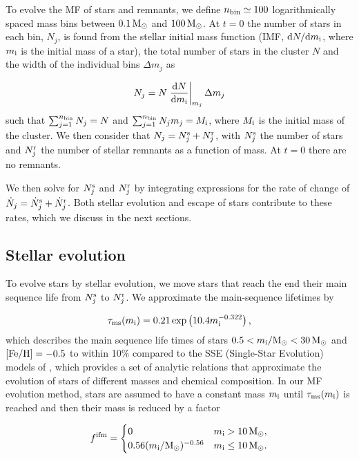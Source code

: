 \documentclass[useAMS,usenatbib,fleqn]{mnras}
\newcommand{\feh}{\[Fe/H\]}
\newcommand{\msun}{{\rm M}_\odot}
\newcommand{\comm}[1]{#1}
\def\fifm{f^{\rm ifm}}
\def\feh{{\rm [Fe/H]}}
\newcommand{\mi}{m_{\rm i}}
\newcommand{\mj}{m_j}
\newcommand{\dr}{{\rm d}}
\newcommand{\nbin}{n_{\rm bin}}
\newcommand{\nj}{N_j}
\newcommand{\njs}{N_j^{\rm s}}
\newcommand{\njr}{N_j^{\rm r}}
\newcommand{\njdot}{\dot{N}_j}
\newcommand{\njrdot}{\dot{N}_j^{\rm r}}
\newcommand{\njsdot}{\dot{N}_j^{\rm s}}
\newcommand{\tms}{\tau_{\rm ms}}
\begin{document}
To evolve the MF of  stars and remnants, we define $\nbin\simeq100$
logarithmically spaced mass bins between $0.1\,\msun$ and $100\,\msun$. At $t=0$
the number of stars in each bin, $\nj$, is found from the stellar initial mass
function (IMF, $\dr N/\dr\mi$, \comm{where $\mi$ is the initial mass of a star}),
the total number of stars in the cluster $N$ and the width of the individual
bins $\Delta \mj$ as

\begin{equation}
\nj= N \left.\frac{\dr N}{\dr\mi}\right|_{m_j} \Delta \mj
\end{equation}
such that $\sum_{j=1}^{\nbin} \nj = N$ and $\sum_{j=1}^{\nbin} \nj\mj = M_{\rm
i}$, where $M_{\rm i}$ is the initial mass of the cluster. We then consider that
$\nj = \njs  + \njr$, with $\njs$ the number of stars and $\njr$ the number of
stellar remnants as a function of mass. At $t=0$ there are no remnants. 

We then solve for $\njs$ and $\njr$ by integrating expressions for the rate
of change of $\njdot = \njsdot + \njrdot$. Both stellar evolution and escape of
stars contribute to these rates, which we discuss in the next sections. 


\subsection{Stellar evolution}
\label{ssec:sev}
To  evolve stars by stellar evolution, we move stars that reach the end their
main sequence life from $\njs$ to $\njr$.  We approximate  the main-sequence
lifetimes by

\begin{equation}
\tms(\mi) = 0.21\exp\left(10.4\mi^{-0.322}\right),
\label{eq:tms}
\end{equation}
which describes the main sequence life times of stars $0.5<\mi/\msun<30\,\msun$
and $\feh=-0.5$ to within 10\% compared to the SSE (Single-Star Evolution)
models of \citet{2000MNRAS.315..543H}, \comm{which provides a set of analytic
    relations that approximate the evolution of stars of different masses and
chemical composition}. \comm{In our MF evolution method,} stars are assumed to
have a constant mass $\mi$ until $\tms(\mi)$ is reached and then their mass is
reduced by a factor

\begin{align}
\fifm=
\begin{cases}
0 & \mi>10\,\msun,\\
0.56(\mi/\msun)^{-0.56} & \mi\le10\,\msun.
\end{cases}
\end{align}
\end{document}
